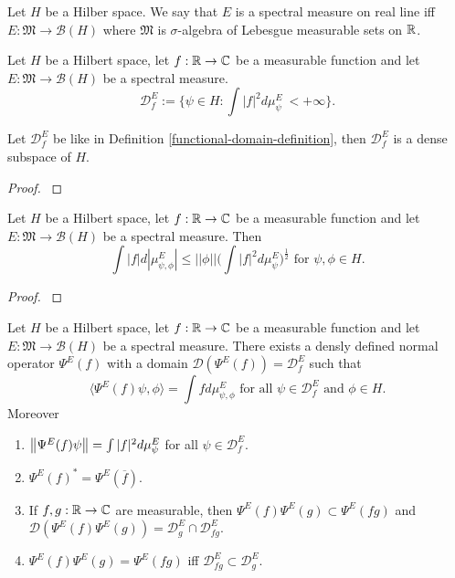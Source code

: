 \documentclass[main.tex]{subfiles}
\begin{document}
\begin{definition}
Let $H$ be a Hilber space. We say that $E$ is a spectral measure on real line iff $E:\mathfrak{M}\to \mathcal{B}(H)$ where $\mathfrak{M}$ is $\sigma$-algebra of Lebesgue measurable sets on $\mathbb{R}$.
\end{definition}
\begin{definition}
\label{functional-domain-definition}
Let $H$ be a Hilbert space, let $f:\mathbb{R}\to\mathbb{C}$ be a measurable function and let $E:\mathfrak{M}\to \mathcal{B}(H)$ be a spectral measure.
\begin{equation}
\mathcal{D}^E_f := \{\psi\in H: \int |f|^2 d\mu^E_\psi\ < +\infty\}.
\end{equation}
\end{definition}
\begin{theorem}
Let $\mathcal{D}^E_f$ be like in Definition \ref{functional-domain-definition}, then $\mathcal{D}^E_f$ is a dense subspace of $H$.
\end{theorem}
\begin{proof}
\cite[see][Unbounded Operators on a Hilbert Space, Resolution of Identity]{rudin1991}
\end{proof}
\begin{theorem}
Let $H$ be a Hilbert space, let $f:\mathbb{R}\to\mathbb{C}$ be a measurable function and let $E:\mathfrak{M}\to \mathcal{B}(H)$ be a spectral measure. Then
\begin{equation}
\int |f|d|\mu^E_{\psi, \phi}| \leq ||\phi||\bigg(\int |f|^2 d\mu^E_\psi\bigg)^\frac{1}{2} \text{ for } \psi,\phi\in H.
\end{equation}
\begin{proof}
\cite[see][Unbounded Operators on a Hilbert Space, Resolution of Identity]{rudin1991}
\end{proof}
\end{theorem}
\begin{theorem}
\label{central-functional-analisys}
Let $H$ be a Hilbert space, let $f:\mathbb{R}\to\mathbb{C}$ be a measurable function and let $E:\mathfrak{M}\to \mathcal{B}(H)$ be a spectral measure. There exists a densly defined normal operator $\Psi^E(f)$ with a domain $\mathcal{D}({\Psi^E(f)}) = \mathcal{D}^E_f$ such that 
\begin{equation}
\langle \Psi^E(f)\psi, \phi \rangle = \int f d\mu^E_{\psi, \phi} \text{ for all } \psi\in\mathcal{D}^E_f \text{ and } \phi\in H.
\end{equation}
Moreover
\begin{enumerate}
\item $\norm{\Psi^E(f)\psi} = \int |f|^2 d\mu^E_\psi$ for all $\psi\in \mathcal{D}^E_f$.
\item $\Psi^E(f)^* = \Psi^E(\overline{f})$.
\item
If $f,g:\mathbb{R}\to\mathbb{C}$ are measurable, then $\Psi^E(f)\Psi^E(g) \subset \Psi^E(fg)$ and $\mathcal{D}(\Psi^E(f)\Psi^E(g)) = \mathcal{D}^E_g \cap \mathcal{D}^E_{fg}$.
\item $\Psi^E(f)\Psi^E(g) = \Psi^E(fg)$ iff $\mathcal{D}^E_{fg}\subset\mathcal{D}^E_g$.

\end{enumerate} 
\end{theorem}
\end{document}
